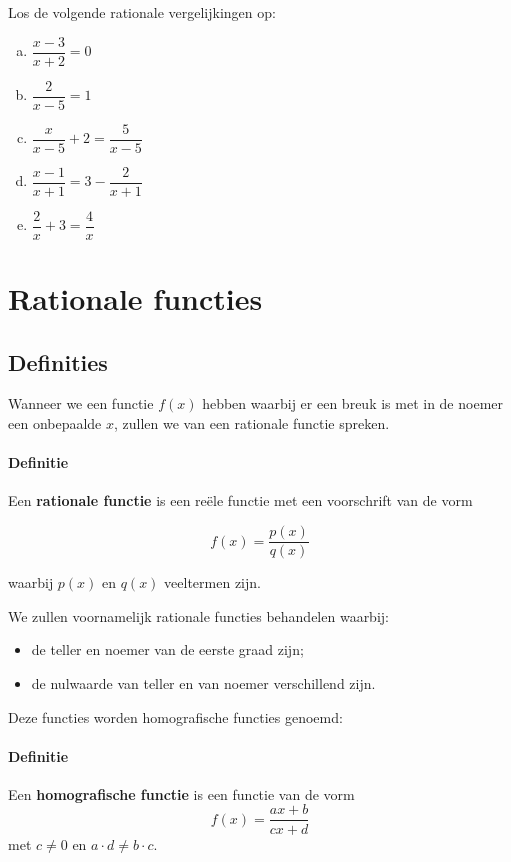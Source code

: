 \documentclass[12pt]{article}
\begin{document}
\begin{oefening}  %
Los de volgende rationale vergelijkingen op:
\begin{enumerate}[(a)]
  \itemsep1em
  \item $\dfrac{x-3}{x+2}=0$
  \item $\dfrac{2}{x-5}=1$
  \item $\dfrac{x}{x-5}+2=\dfrac{5}{x-5}$
  \item $\dfrac{x-1}{x+1}=3-\dfrac{2}{x+1}$
  \item $\dfrac{2}{x}+3=\dfrac{4}{x}$
\end{enumerate}
\end{oefening}

\section{Rationale functies}

\subsection{Definities}

Wanneer we een functie $f(x)$ hebben waarbij er een breuk is met in de noemer een onbepaalde $x$, zullen we van een rationale functie spreken.

\paragraph*{Definitie}
\begin{mdframed}
Een {\bf rationale functie} is een reële functie met een voorschrift van de vorm

$$f(x)=\dfrac{p(x)}{q(x)}$$

waarbij $p(x)$ en $q(x)$ veeltermen zijn.
\end{mdframed}

We zullen voornamelijk rationale functies behandelen waarbij:
\begin{itemize}
  \item de teller en noemer van de eerste graad zijn;
  \item de nulwaarde van teller en van noemer verschillend zijn.
\end{itemize}
Deze functies worden homografische functies genoemd:

\paragraph*{Definitie}
\begin{mdframed}
Een {\bf homografische functie} is een functie van de vorm
$$f(x)=\dfrac{ax+b}{cx+d}$$
met $c\neq 0$ en $a\cdot d\neq b\cdot c$.
\end{mdframed}
\end{document}
